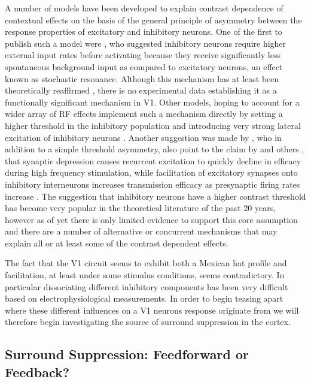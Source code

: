 A number of models have been developed to explain contrast dependence
of contextual effects on the basis of the general principle of
asymmetry between the response properties of excitatory and inhibitory
neurons. One of the first to publish such a model were
\cite{Stemmler1995}, who suggested inhibitory neurons require higher
external input rates before activating because they receive
significantly less spontaneous background input as compared to
excitatory neurons, an effect known as stochastic resonance. Although
this mechanism has at least been theoretically reaffirmed
\citep{Bezrukov1997}, there is no experimental data establishing it as
a functionally significant mechanism in V1. Other models, hoping to
account for a wider array of RF effects implement such a mechanism
directly by setting a higher threshold in the inhibitory population
and introducing very strong lateral excitation of inhibitory neurons
\citep{Schwabe2006}. Another suggestion was made by \cite{Somers1998},
who in addition to a simple threshold asymmetry, also point to the
claim by \cite{Thomson1994} and others \citep{Abbott1997,Tsodyks1997},
that synaptic depression causes recurrent excitation to quickly
decline in efficacy during high frequency stimulation, while
facilitation of excitatory synapses onto inhibitory interneurons
increases transmission efficacy as presynaptic firing rates increase
\citep{Thomson1995}. The suggestion that inhibitory neurons have a
higher contrast threshold has become very popular in the theoretical
literature of the past 20 years, however as of yet there is only
limited evidence to support this core assumption and there are a
number of alternative or concurrent mechanisms that may explain all or
at least some of the contrast dependent effects.

The fact that the V1 circuit seems to exhibit both a Mexican hat
profile and facilitation, at least under some stimulus conditions,
seems contradictory. In particular dissociating different inhibitory
components has been very difficult based on electrophysiological
measurements. In order to begin teasing apart where these different
influences on a V1 neurons response originate from we will therefore
begin investigating the source of surround suppression in the cortex.

\subsection{Surround Suppression: Feedforward or Feedback?}

